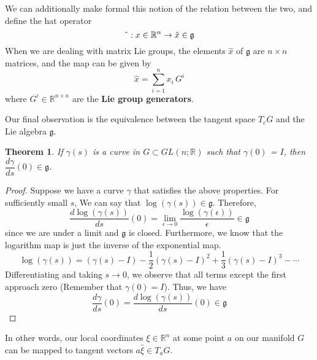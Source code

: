 \documentclass[reqno]{amsart}
\newtheorem{thm}{Theorem}[section]
\theoremstyle{definition}
\numberwithin{equation}{section}
\begin{document}
 We can additionally make formal this notion of the relation between the two, and define the hat operator
 \begin{equation*}
     \string^ : x \in \mathbb{R}^n \to \hat x \in \mathfrak{g}
 \end{equation*}
 When we are dealing with matrix Lie groups, the elements $\hat x$ of $\mathfrak{g}$ are $n \times n$ matrices, and the map can be given by
 \begin{equation}\label{Matrix_Lie_Groups}
    \hat x = \sum_{i = 1}^n x_i\,G^i
 \end{equation}
 where $G^i \in \mathbb{R}^{n \times n}$ are the \textbf{Lie group generators}.

 Our final observation is the equivalence between the tangent space $T_eG$ and the Lie algebra $\mathfrak{g}$.

 \begin{thm}
     If $\gamma(s)$ is a curve in $G \subset GL(n; \mathbb{R})$ such that $\gamma(0)$ = $I$, then $\dfrac{d\gamma}{ds}(0) \in \mathfrak{g}$.
 \end{thm}
 \begin{proof}
     Suppose we have a curve $\gamma$ that satisfies the above properties. For sufficiently small $s$, We can say that $\log(\gamma(s)) \in \mathfrak{g}$. Therefore,
     \begin{equation*}
         \frac{d\log(\gamma(s))}{ds}(0) = \lim_{\epsilon \to 0}\frac{\log(\gamma(\epsilon))}{\epsilon} \in \mathfrak{g}
     \end{equation*} 
     since we are under a limit and $\mathfrak{g}$ is closed. Furthermore, we know that the logarithm map is just the inverse of the exponential map.
     \begin{equation*}
         \log(\gamma(s)) = (\gamma(s) - I) - \frac{1}{2}(\gamma(s) - I)^2 + \frac{1}{3}(\gamma(s) - I)^3 - \cdots
     \end{equation*}
     Differentiating and taking $s \to 0$, we observe that all terms except the first approach zero (Remember that $\gamma(0) = I$). Thus, we have
     \begin{equation*}
         \frac{d\gamma}{ds}(0) = \frac{d\log(\gamma(s))}{ds}(0) \in \mathfrak{g}
     \end{equation*}
 \end{proof}

 In other words, our local coordinates $\xi \in \mathbb{R}^n$ at some point $a$ on our manifold $G$ can be mapped to tangent vectors $a\hat\xi \in T_aG.$
\end{document}
